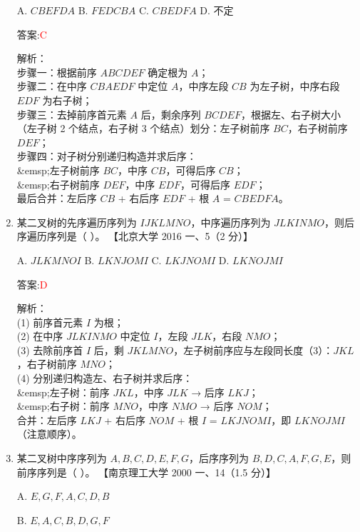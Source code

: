 \documentclass[lang=cn,newtx,10pt,scheme=chinese]{../../../elegantbook}
\begin{document}
\begin{enumerate}
    A. $CBEFDA$  \quad B. $FEDCBA$  \quad C. $CBEDFA$  \quad D. 不定

    答案:\textcolor{red}{C}

    解析：\\
    步骤一：根据前序 $ABCDEF$ 确定根为 $A$；\\
    步骤二：在中序 $CBAEDF$ 中定位 $A$，中序左段 $CB$ 为左子树，中序右段 $EDF$ 为右子树；\\
    步骤三：去掉前序首元素 $A$ 后，剩余序列 $BCDEF$，根据左、右子树大小（左子树 2 个结点，右子树 3 个结点）划分：左子树前序 $BC$，右子树前序 $DEF$；\\
    步骤四：对子树分别递归构造并求后序：\\
    \&emsp;左子树前序 $BC$，中序 $CB$，可得后序 $CB$；\\
    \&emsp;右子树前序 $DEF$，中序 $EDF$，可得后序 $EDF$；\\
    最后合并：左后序 $CB$ + 右后序 $EDF$ + 根 $A$ = $CBEDFA$。\\

\item 某二叉树的先序遍历序列为 $IJKLMNO$，中序遍历序列为 $JLKINMO$，则后序遍历序列是（ ）。  
    【北京大学 2016 一、5（2 分）】

    A. $JLKMNOI$  \quad B. $LKNJOMI$  \quad C. $LKJNOMI$  \quad D. $LKNOJMI$

    答案:\textcolor{red}{D}

    解析：\\
    (1) 前序首元素 $I$ 为根；\\
    (2) 在中序 $JLKINMO$ 中定位 $I$，左段 $JLK$，右段 $NMO$；\\
    (3) 去除前序首 $I$ 后，剩 $JKLMNO$，左子树前序应与左段同长度（3）：$JKL$，右子树前序 $MNO$；\\
    (4) 分别递归构造左、右子树并求后序：\\
   \&emsp;左子树：前序 $JKL$，中序 $JLK$ → 后序 $LKJ$；\\
   \&emsp;右子树：前序 $MNO$，中序 $NMO$ → 后序 $NOM$；\\
    合并：左后序 $LKJ$ + 右后序 $NOM$ + 根 $I$ = $LKJ N O M I$，即 $LKNOJMI$（注意顺序）。\\

\item 某二叉树中序序列为 $A, B, C, D, E, F, G$，后序序列为 $B, D, C, A, F, G, E$，则前序序列是（ ）。  
    【南京理工大学 2000 一、14（1.5 分）】

    A. $E, G, F, A, C, D, B$

    B. $E, A, C, B, D, G, F$


\end{enumerate}
\end{document}
